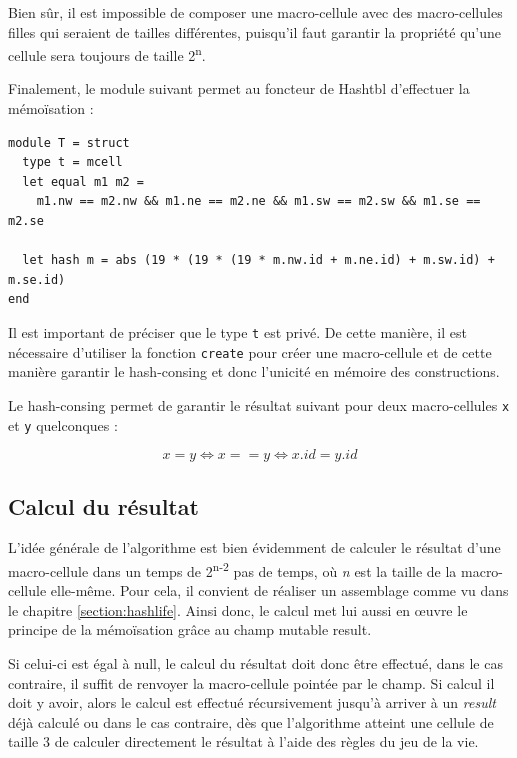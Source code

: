 \documentclass[a4paper,12pt]{report}
\begin{document}
Bien sûr, il est impossible de composer une macro-cellule avec des
macro-cellules filles qui seraient de tailles différentes, puisqu'il faut
garantir la propriété qu'une cellule sera toujours de taille 
2\textsuperscript{n}.

\medskip

Finalement, le module suivant permet au foncteur de Hashtbl d'effectuer la
mémoïsation :
\begin{verbatim}
module T = struct
  type t = mcell
  let equal m1 m2 =
    m1.nw == m2.nw && m1.ne == m2.ne && m1.sw == m2.sw && m1.se == m2.se
      
  let hash m = abs (19 * (19 * (19 * m.nw.id + m.ne.id) + m.sw.id) + m.se.id)
end
\end{verbatim}

Il est important de préciser que le type \texttt{t} est privé. De cette manière,
il est nécessaire d'utiliser la fonction \texttt{create} pour créer une
macro-cellule et de cette manière garantir le hash-consing et donc l'unicité en
mémoire des constructions. 

Le hash-consing permet de garantir le résultat suivant pour deux macro-cellules
\texttt{x} et \texttt{y} quelconques :

\begin{equation}
   x = y \Leftrightarrow x == y \Leftrightarrow x.id = y.id
\end{equation}

\medskip



\subsection*{Calcul du résultat}

L'idée générale de l'algorithme est bien évidemment de calculer le résultat
d'une macro-cellule dans un temps de 2\textsuperscript{n-2} pas de temps, où
\textit{n} est la taille de la macro-cellule elle-même. Pour cela, il convient
de réaliser un assemblage comme vu dans le chapitre
\ref{section:hashlife}. Ainsi donc, le calcul met lui aussi en \oe uvre le
principe de la mémoïsation grâce au champ mutable result.

Si celui-ci est égal à null, le calcul du résultat doit donc être effectué, dans
le cas contraire, il suffit de renvoyer la macro-cellule pointée par le
champ. Si calcul il doit y avoir, alors le calcul est effectué récursivement
jusqu'à arriver à un \textit{result} déjà calculé ou dans le cas contraire, dès
que l'algorithme atteint une cellule de taille 3 de calculer
directement le résultat à l'aide des règles du jeu de la vie.
\end{document}
